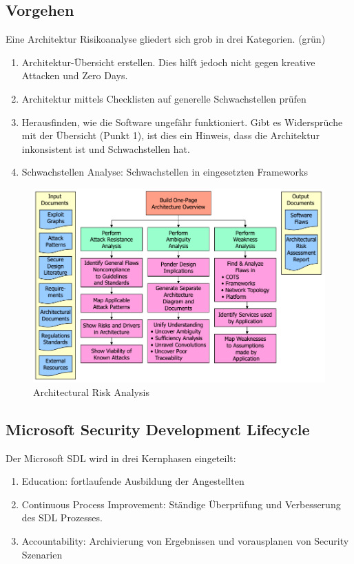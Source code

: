 \clearpage

\subsection{Vorgehen}
Eine Architektur Risikoanalyse gliedert sich grob in drei Kategorien. (grün)
\begin{enumerate}
	\item Architektur-Übersicht erstellen. Dies hilft jedoch nicht gegen kreative Attacken und Zero Days.
	\item Architektur mittels Checklisten auf generelle Schwachstellen prüfen
	\item Herausfinden, wie die Software ungefähr funktioniert. Gibt es Widersprüche mit der Übersicht (Punkt 1), ist dies ein Hinweis, dass die Architektur inkonsistent ist und Schwachstellen hat. 
	\item Schwachstellen Analyse: Schwachstellen in eingesetzten Frameworks
\end{enumerate}
\begin{figure}[h!]
	\centering
	\includegraphics[width=0.7\linewidth]{images/architectural_risk_analysis}
	\caption{Architectural Risk Analysis}
	\label{fig:architecturalriskanalysis}
\end{figure}

\subsection{Microsoft Security Development Lifecycle}
Der Microsoft SDL wird in drei Kernphasen eingeteilt:
\begin{enumerate}
	\item Education: fortlaufende Ausbildung der Angestellten
	\item Continuous Process Improvement: Ständige Überprüfung und Verbesserung des SDL Prozesses.
	\item Accountability: Archivierung von Ergebnissen und vorausplanen von Security Szenarien
\end{enumerate}

